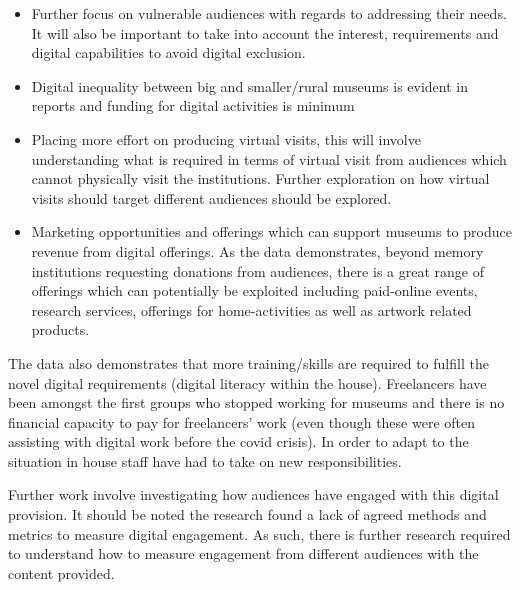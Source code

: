 \documentclass{egpubl}
\begin{document}
\begin{itemize}
\item Further focus on vulnerable audiences with regards to addressing their needs. It will also be important to take into account the interest, requirements and digital capabilities  to avoid digital exclusion.
\item Digital inequality between big and smaller/rural museums is evident in reports and funding for digital activities is minimum 
\item Placing more effort on producing virtual visits, this will involve understanding what is required in terms of virtual visit from audiences which cannot physically visit the institutions. Further exploration on how virtual visits should target different audiences should be explored.
\item Marketing opportunities and offerings which can support museums to produce revenue from digital offerings. As the data demonstrates, beyond memory institutions requesting donations from audiences, there is a great range of offerings which can potentially be exploited including paid-online events, research services, offerings for home-activities as well as artwork related products.
\end{itemize}

The  data also demonstrates that more training/skills are required to fulfill the novel digital requirements (digital literacy within the house). Freelancers have been amongst the first groups who stopped working for museums and there is no financial capacity to pay for freelancers' work (even though these were often assisting with digital work before the covid crisis). In order to adapt to the situation in house staff have had to take on new responsibilities. 

Further work involve investigating how audiences have engaged with this digital provision. It should be noted the research found a lack of agreed methods and metrics to measure digital engagement. As such, there is further research required to understand how to measure engagement from different audiences with the content provided. 
\end{document}
